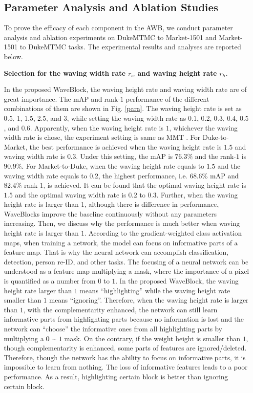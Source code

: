 \documentclass[journal]{IEEEtran}
\begin{document}
\subsection{Parameter Analysis and Ablation Studies}
To prove the efficacy of each component in the AWB, we conduct parameter analysis and ablation experiments on DukeMTMC to Market-1501 and Market-1501 to DukeMTMC tasks. The experimental results and analyses are reported below.\par 
\textbf{Selection for the waving width rate $r_w$ and waving height rate $r_h$.}\par 
In the proposed WaveBlock, the waving height rate and waving width rate are of great importance. The mAP and rank-$1$ performance of the different combinations of them are shown in Fig. \ref{para}. The waving height rate is set as $0.5$, $1$, $1.5$, $2.5$, and $3$, while setting the waving width rate as $0.1$, $0.2$, $0.3$, $0.4$, $0.5$, and $0.6$. Apparently, when the waving height rate is $1$, whichever the waving width rate is chose, the experiment setting is same as MMT \cite{ge2020mutual}. For Duke-to-Market, the best performance is achieved when the waving height rate is $1.5$ and waving width rate is $0.3$. Under this setting, the mAP is $76.3\%$ and the rank-$1$ is $90.9\%$. For Market-to-Duke, when the waving height rate equals to $1.5$ and the waving width rate equals to $0.2$, the highest performance, i.e. $68.6\%$ mAP and $82.4\%$ rank-$1$, is achieved. It can be found that the optimal waving height rate is $1.5$ and the optimal waving width rate is $0.2$ to $0.3$. Further, when the waving height rate is larger than $1$, although there is difference in performance, WaveBlocks improve the baseline continuously without any parameters increasing. Then, we discuss why the performance is much better when waving height rate is larger than $1$. According to the gradient-weighted class activation maps, when training a network, the model can focus on informative parts of a feature map. That is why the neural network can accomplish classification, detection, person re-ID, and other tasks. The focusing of a neural network can be understood as a feature map multiplying a mask, where the importance of a pixel is quantified as a number from $0$ to $1$. In the proposed WaveBlock, the waving height rate larger than $1$ means ``highlighting'' while the waving height rate smaller than $1$ means ``ignoring''. Therefore, when the waving height rate is larger than $1$, with the complementarity enhanced, the network can still learn informative parts from highlighting parts because no information is lost and the network can ``choose'' the informative ones from all highlighting parts by multiplying a $0\sim1$ mask. On the contrary, if the weight height is smaller than $1$, though complementarity is enhanced, some parts of features are ignored/deleted. Therefore, though the network has the ability to focus on informative parts, it is impossible to learn from nothing.  The loss of informative features leads to a poor performance. As a result, highlighting certain block is better than ignoring certain block.
\end{document}
